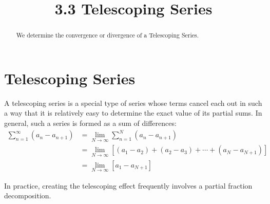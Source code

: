\documentclass[handout]{ximera}
\title{3.3 Telescoping Series}
\begin{document}
\begin{abstract}
We determine the convergence or divergence of a Telescoping Series.
\end{abstract}

\maketitle

\section{Telescoping Series}

A telescoping series is a special type of series whose terms cancel each out in such a way that it is relatively easy to determine the
exact value of its partial sums. In general, such a series is formed as a sum of differences:
\begin{align*}
\sum_{n=1}^\infty \left(a_n -a_{n+1}\right) &= \lim_{N \to \infty} \sum_{n=1}^N \left(a_n -a_{n+1}\right)\\
&=\lim_{N \to \infty}\left[\left(a_1 - a_2\right) + \left(a_2 - a_3\right) + \cdots + \left(a_N - a_{N+1}\right) \right]\\
&= \lim_{N \to \infty}\left[a_1 - a_{N+1}\right]
\end{align*}

In practice, creating the telescoping effect frequently involves a partial fraction decomposition.
\end{document}

